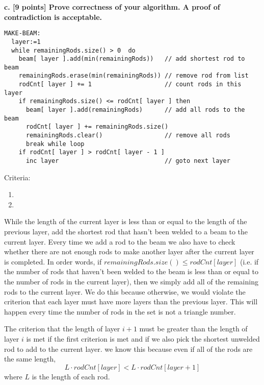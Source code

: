 \documentclass[12pt]{article}
\begin{document}
\newpage
\noindent \textbf{c. [9 points] Prove correctness of your algorithm. A proof of contradiction is acceptable.}

\begin{lstlisting}[frame=single]
MAKE-BEAM:
  layer:=1                                                        
  while remainingRods.size() > 0  do 
    beam[ layer ].add(min(remainingRods))   // add shortest rod to beam
    remainingRods.erase(min(remainingRods)) // remove rod from list
    rodCnt[ layer ] += 1                    // count rods in this layer
    if remainingRods.size() <= rodCnt[ layer ] then
      beam[ layer ].add(remainingRods)      // add all rods to the beam
      rodCnt[ layer ] += remainingRods.size()
      remainingRods.clear()                 // remove all rods 
      break while loop
    if rodCnt[ layer ] > rodCnt[ layer - 1 ]
      inc layer                             // goto next layer
\end{lstlisting} 

Criteria:
\begin{enumerate}
  \item 
  \item 
\end{enumerate}

While the length of the current layer is less than or equal to the 
length of the previous layer, add the shortest rod that hasn't 
been welded to a beam to the current layer. 
Every time we add a rod to the beam we also have to check whether there 
are not enough rods to make another layer after the current layer is completed. 
In order words, if $ remainingRods.size() \le rodCnt[ layer ] $
(i.e. if the number of rods that haven't been welded to the beam is less than 
or equal to the number of rods in the current layer), 
then we simply add all of the 
remaining rods to the current layer. We do this because otherwise, we would 
violate the criterion that each layer must have more layers than the 
previous layer. 
This will happen every time the number of rods in the set is not a triangle 
number.

The criterion that the length of layer $i+1$ must be greater than the length of 
layer $i$ is met if the first criterion is met and if we also pick the shortest
unwelded rod to add to the current layer. we know this because even if all
of the rods are the same length, 
\[ L \cdot rodCnt[layer] < L \cdot rodCnt[layer+1] \] where $L$ is the length of each rod.
\end{document}
